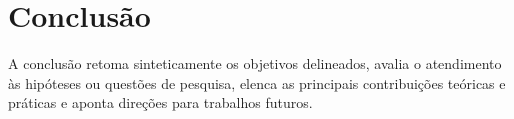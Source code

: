 \section{Conclusão}
\label{sec:conclusao}

A conclusão retoma sinteticamente os objetivos delineados, avalia o atendimento às hipóteses ou questões de pesquisa, elenca as principais contribuições teóricas e práticas e aponta direções para trabalhos futuros.

